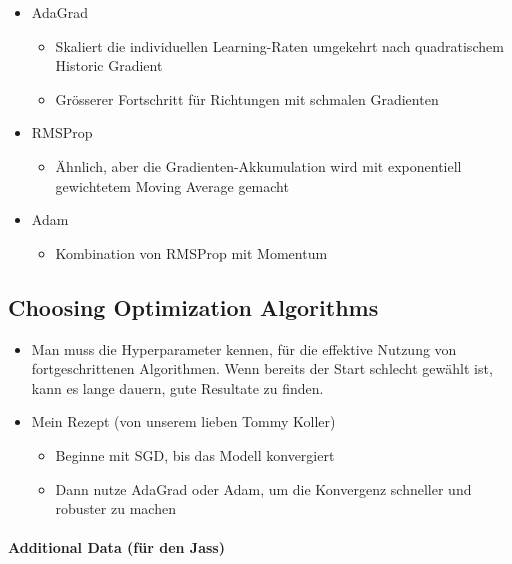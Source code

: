 \documentclass[a4paper]{article}
\begin{document}
		\begin{itemize}
			\item AdaGrad
				\begin{itemize}
					\item Skaliert die individuellen Learning-Raten umgekehrt nach quadratischem Historic Gradient
					\item Grösserer Fortschritt für Richtungen mit schmalen Gradienten
				\end{itemize}
			\item RMSProp
				\begin{itemize}
					\item Ähnlich, aber die Gradienten-Akkumulation wird mit exponentiell gewichtetem Moving Average gemacht
				\end{itemize}
			\item Adam
				\begin{itemize}
					\item Kombination von RMSProp mit Momentum
				\end{itemize}
		\end{itemize}
		
		\subsection{Choosing Optimization Algorithms}
		
		\begin{itemize}
			\item Man muss die Hyperparameter kennen, für die effektive Nutzung von fortgeschrittenen Algorithmen.
				Wenn bereits der Start schlecht gewählt ist, kann es lange dauern, gute Resultate zu finden.
			\item Mein Rezept (von unserem lieben Tommy Koller)
				\begin{itemize}
					\item Beginne mit SGD, bis das Modell konvergiert
					\item Dann nutze AdaGrad oder Adam, um die Konvergenz schneller und robuster zu machen
				\end{itemize}
		\end{itemize}
	
		\paragraph{Additional Data (für den Jass)}
		
\end{document}
